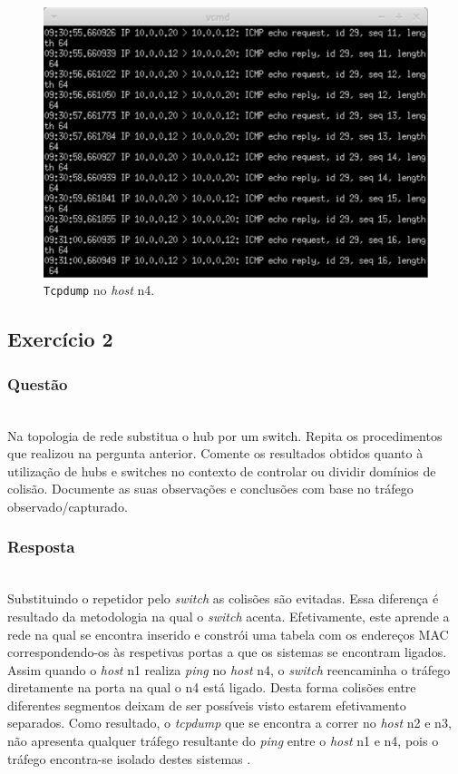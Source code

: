 \documentclass{llncs}
\begin{document}
\begin{figure}
  \begin{center}
	  \includegraphics[scale=0.3]{./imagens/n4_tcpdump_repetidor.png} 
  \end{center}
	\caption{\texttt{Tcpdump} no \textit{host} n4.}
  \label{fig:n4_repetidor}
\end{figure} 

\clearpage
\subsection{Exercício 2}
\subsubsection{Questão}\rule[-10pt]{0pt}{10pt}\\

Na topologia de rede substitua o hub por um switch. Repita os procedimentos que realizou na pergunta anterior. Comente os resultados obtidos quanto à utilização de hubs e switches no contexto de controlar ou dividir domínios de colisão. Documente as suas observações e conclusões com base no tráfego observado/capturado.

\subsubsection{Resposta}\rule[-10pt]{0pt}{10pt}\\

Substituindo o repetidor pelo \textit{switch} as colisões são evitadas. Essa diferença é resultado da metodologia na qual o \textit{switch} acenta. Efetivamente, este aprende a rede na qual se encontra inserido e constrói uma tabela com os endereços MAC correspondendo-os às respetivas portas a que os sistemas se encontram ligados. Assim quando o \textit{host} n1 realiza \textit{ping} no \textit{host} n4, o \textit{switch} reencaminha o tráfego diretamente na porta na qual o n4 está ligado. Desta forma colisões entre diferentes segmentos deixam de ser possíveis visto estarem efetivamento separados. Como resultado, o \textit{tcpdump} que se encontra a correr no \textit{host} n2 e n3, não apresenta qualquer tráfego resultante do \textit{ping} entre o \textit{host} n1 e n4, pois o tráfego encontra-se isolado destes sistemas \cite{wiki:comutador}.
\end{document}
